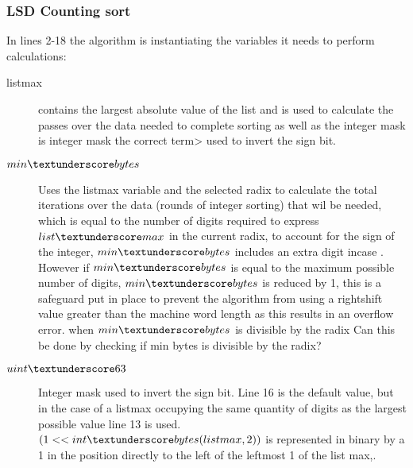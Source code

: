 \documentclass[12pt]{article}
\begin{document}
\subsubsection{LSD Counting sort}
In lines 2-18 the algorithm is instantiating the variables it needs to perform calculations:
\begin{description}
	\item[listmax]contains the largest absolute value of the list and is used to calculate the passes over the data needed to complete sorting as well as the integer mask {\color{red}is integer mask the correct term>} used to invert the sign bit.
	\item[$min\textunderscore bytes$]Uses the listmax variable and the selected radix to calculate the total iterations over the data (rounds of integer sorting) that wil be needed, which is equal to the number of digits required to express $list\textunderscore max$ in the current radix, to account for the sign of the integer,  $min\textunderscore bytes$ includes an extra digit incase . However if $min\textunderscore bytes$ is equal to the maximum possible number of digits, $min\textunderscore bytes$ is reduced by 1, this is a safeguard put in place to prevent the algorithm from using a rightshift value greater than the machine word length as this results in an overflow error. when $min\textunderscore bytes$ is divisible by the radix{\color{red} Can this be done by checking if min bytes is divisible by the radix? }
	\item[$uint\textunderscore 63$]Integer mask used to invert the sign bit. Line 16 is the default value, but in the case of a listmax occupying the same quantity of digits as the largest possible value line 13 is used. 
	$(1 << int\textunderscore bytes(listmax, 2))$ is represented in binary by a 1 in the position directly to the left of the leftmost 1 of the list max,.
	\item[] 
\end{description}
\end{document}
